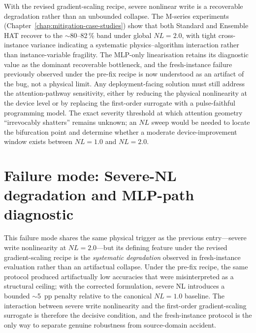With the revised gradient-scaling recipe, severe nonlinear write is a recoverable degradation rather than an unbounded collapse.  The M-series experiments (Chapter~\ref{chap:mitigation-case-studies}) show that both Standard and Ensemble HAT recover to the $\sim$80--82\,\% band under global $NL=2.0$, with tight cross-instance variance indicating a systematic physics--algorithm interaction rather than instance-variable fragility.  The MLP-only linearisation retains its diagnostic value as the dominant recoverable bottleneck, and the fresh-instance failure previously observed under the pre-fix recipe is now understood as an artifact of the bug, not a physical limit.  Any deployment-facing solution must still address the attention-pathway sensitivity, either by reducing the physical nonlinearity at the device level or by replacing the first-order surrogate with a pulse-faithful programming model.  The exact severity threshold at which attention geometry ``irrevocably shatters'' remains unknown; an $NL$ sweep would be needed to locate the bifurcation point and determine whether a moderate device-improvement window exists between $NL=1.0$ and $NL=2.0$.


\section{Failure mode: Severe-NL degradation and MLP-path diagnostic}
\label{sec:failure-severe-nl-degradation}

This failure mode shares the same physical trigger as the previous entry---severe write nonlinearity at $NL=2.0$---but its defining feature under the revised gradient-scaling recipe is the \emph{systematic degradation} observed in fresh-instance evaluation rather than an artifactual collapse.  Under the pre-fix recipe, the same protocol produced artifactually low accuracies that were misinterpreted as a structural ceiling; with the corrected formulation, severe NL introduces a bounded $\sim$5~pp penalty relative to the canonical $NL=1.0$ baseline.  The interaction between severe write nonlinearity and the first-order gradient-scaling surrogate is therefore the decisive condition, and the fresh-instance protocol is the only way to separate genuine robustness from source-domain accident.

